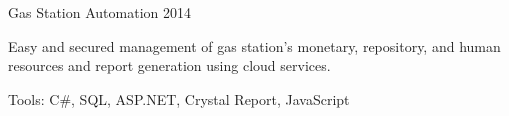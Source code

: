 \begin{cventries}
  \cventry
    {} %
    {Gas Station Automation} %
    {2014} %
    {} %
    {
      \vspace{-3mm}
      \begin{cvitems} %
        \item {Easy and secured management of gas station's monetary, repository, and human resources and report generation using cloud services.}
        \item {Tools: C\#, SQL, ASP.NET, Crystal Report, JavaScript}
      \end{cvitems}
    }
    {}


\end{cventries}
